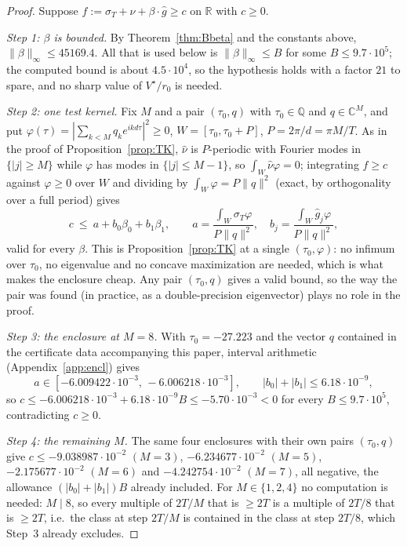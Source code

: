 \documentclass[11pt]{amsart}
\theoremstyle{definition}
\theoremstyle{remark}
\newcommand{\C}{\mathbb C}
\newcommand{\R}{\mathbb R}
\newcommand{\Q}{\mathbb Q}
\newcommand{\sT}{\sigma_T}
\newcommand{\gh}[1]{\widehat g_{#1}}
\newcommand{\nuh}{\widehat\nu}
\begin{document}
\begin{proof}
Suppose $f:=\sT+\nuh+\beta\cdot\widehat g\ge c$ on $\R$ with $c\ge0$.

\emph{Step 1: $\beta$ is bounded.} By Theorem~\ref{thm:Bbeta} and the constants above,
$\|\beta\|_\infty\le45169.4$. All that is used below is $\|\beta\|_\infty\le B$ for some
$B\le9.7\cdot10^5$; the computed bound is about $4.5\cdot10^4$, so the hypothesis holds with a
factor $21$ to spare, and no sharp value of $V^\star/r_0$ is needed.

\emph{Step 2: one test kernel.} Fix $M$ and a pair $(\tau_0,q)$ with $\tau_0\in\Q$ and
$q\in\C^M$, and put $\varphi(\tau)=|\sum_{k<M}q_ke^{ikd\tau}|^2\ge0$, $W=[\tau_0,\tau_0+P]$,
$P=2\pi/d=\pi M/T$. As in the proof of Proposition~\ref{prop:TK}, $\nuh$ is $P$-periodic with Fourier
modes in $\{|j|\ge M\}$ while $\varphi$ has modes in $\{|j|\le M-1\}$, so $\int_W\nuh\varphi=0$;
integrating $f\ge c$ against $\varphi\ge0$ over $W$ and dividing by $\int_W\varphi=P\|q\|^2$ (exact,
by orthogonality over a full period) gives
\[
c\ \le\ a+b_0\beta_0+b_1\beta_1,\qquad a=\frac{\int_W\sT\varphi}{P\|q\|^2},\quad
b_j=\frac{\int_W\gh j\varphi}{P\|q\|^2},
\]
valid for every $\beta$. This is Proposition~\ref{prop:TK} at a single $(\tau_0,\varphi)$: no
infimum over $\tau_0$, no eigenvalue and no concave maximization are needed, which is what makes the
enclosure cheap. Any pair $(\tau_0,q)$ gives a valid bound, so the way the pair was found (in
practice, as a double-precision eigenvector) plays no role in the proof.

\emph{Step 3: the enclosure at $M=8$.} With $\tau_0=-27.223$ and the vector $q$ contained in the
certificate data accompanying this paper, interval arithmetic (Appendix~\ref{app:encl}) gives
\[
a\in[-6.009422\cdot10^{-3},\,-6.006218\cdot10^{-3}],\qquad |b_0|+|b_1|\le6.18\cdot10^{-9},
\]
so $c\le-6.006218\cdot10^{-3}+6.18\cdot10^{-9}B\le-5.70\cdot10^{-3}<0$ for every $B\le9.7\cdot10^5$,
contradicting $c\ge0$.

\emph{Step 4: the remaining $M$.} The same four enclosures with their own pairs $(\tau_0,q)$ give
$c\le-9.038987\cdot10^{-2}$ $(M=3)$, $-6.234677\cdot10^{-2}$ $(M=5)$, $-2.175677\cdot10^{-2}$ $(M=6)$
and $-4.242754\cdot10^{-2}$ $(M=7)$, all negative, the allowance $(|b_0|+|b_1|)B$ already included.
For $M\in\{1,2,4\}$ no computation is needed: $M\mid8$, so every multiple of $2T/M$ that is $\ge2T$ is
a multiple of $2T/8$ that is $\ge2T$, i.e.\ the class at step $2T/M$ is contained in the class at step
$2T/8$, which Step~3 already excludes.
\end{proof}
\end{document}
